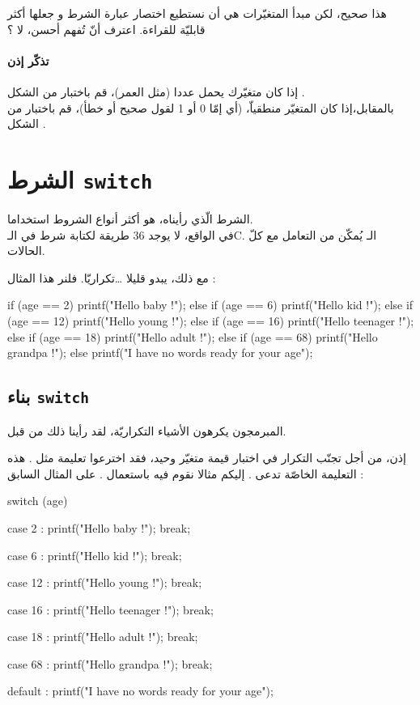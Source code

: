 هذا صحيح، لكن مبدأ المتغيّرات هي أن نستطيع اختصار عبارة الشرط و جعلها أكثر قابليّة للقراءة. اعترف أنّ
تُفهم أحسن، لا ؟

\paragraph{تذكّر إذن}
إذا كان متغيّرك يحمل عددا (مثل العمر)، قم باختبار من الشكل
.\\
بالمقابل،إذا كان المتغيّر منطقياّ، (أي إمّا 0 أو 1 لقول صحيح أو خطأ)، قم باختبار من الشكل
.

\section{الشرط \texttt{switch}}

الشرط
الّذي رأيناه، هو أكثر أنواع الشروط استخداما.\\
في الواقع، لا يوجد 36 طريقة لكتابة شرط في الـ\textenglish{C}.
الـ
يُمكّن من التعامل مع كلّ الحالات.

مع ذلك،
يبدو قليلا \dots تكراريّا. فلنر هذا المثال :

\begin{Csource}
if (age == 2)
{
	printf("Hello baby !");
}
else if (age == 6)
{
	printf("Hello kid !");
}
else if (age == 12)
{
	printf("Hello young !");
}
else if (age == 16)
{
	printf("Hello teenager !");
}
else if (age == 18)
{
	printf("Hello adult !");
}
else if (age == 68)
{
	printf("Hello grandpa !");
}
else
{
	printf("I have no words ready for your age");
}
\end{Csource}

\subsection{بناء \texttt{switch}}

المبرمجون يكرهون الأشياء التكراريّة، لقد رأينا ذلك من قبل.

إذن، من أجل تجنّب التكرار في اختبار قيمة متغيّر وحيد، فقد اخترعوا تعليمة مثل
.
هذه التعليمة الخاصّة تدعى
.
إليكم مثالا نقوم فيه باستعمال
.
على المثال السابق :

\begin{Csource}
switch (age)
{
	case 2 :
	printf("Hello baby !");
	break;
	
	case 6 :
	printf("Hello kid !");
	break;
	
	case 12 :
	printf("Hello young !");
	break;
	
	case 16 :
	printf("Hello teenager !");
	break;
	
	case 18 :
	printf("Hello adult !");
	break;
	
	case 68 :
	printf("Hello grandpa !");
	break;
	
	default :
	printf("I have no words ready for your age");
}
\end{Csource}


